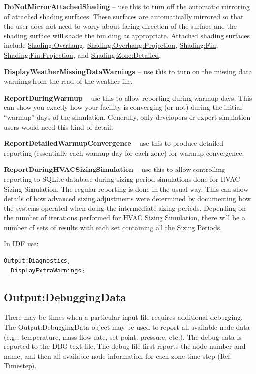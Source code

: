 \textbf{DoNotMirrorAttachedShading} -- use this to turn off the automatic mirroring of attached shading surfaces. These surfaces are automatically mirrored so that the user does not need to worry about facing direction of the surface and the shading surface will shade the building as appropriate. Attached shading surfaces include \hyperref[shadingoverhang]{Shading:Overhang}, \hyperref[shadingoverhangprojection]{Shading:Overhang:Projection}, \hyperref[shadingfin]{Shading:Fin}, \hyperref[shadingfinprojection]{Shading:Fin:Projection}, and \hyperref[shadingzonedetailed-000]{Shading:Zone:Detailed}.

\textbf{DisplayWeatherMissingDataWarnings} -- use this to turn on the missing data warnings from the read of the weather file.

\textbf{ReportDuringWarmup} -- use this to allow reporting during warmup days. This can show you exactly how your facility is converging (or not) during the initial ``warmup'' days of the simulation. Generally, only developers or expert simulation users would need this kind of detail.

\textbf{ReportDetailedWarmupConvergence} -- use this to produce detailed reporting (essentially each warmup day for each zone) for warmup convergence.

\textbf{ReportDuringHVACSizingSimulation} -- use this to allow controlling reporting to SQLite database during sizing period simulations done for HVAC Sizing Simulation. The regular reporting is done in the usual way. This can show details of how advanced sizing adjustments were determined by documenting how the systems operated when doing the intermediate sizing periods. Depending on the number of iterations performed for HVAC Sizing Simulation, there will be a number of sets of results with each set containing all the Sizing Periods.

In IDF use:

\begin{lstlisting}
Output:Diagnostics,
  DisplayExtraWarnings;
\end{lstlisting}

\subsection{Output:DebuggingData}\label{outputdebuggingdata}

There may be times when a particular input file requires additional debugging. The Output:DebuggingData object may be used to report all available node data (e.g., temperature, mass flow rate, set point, pressure, etc.). The debug data is reported to the DBG text file. The debug file first reports the node number and name, and then all available node information for each zone time step (Ref. Timestep).

